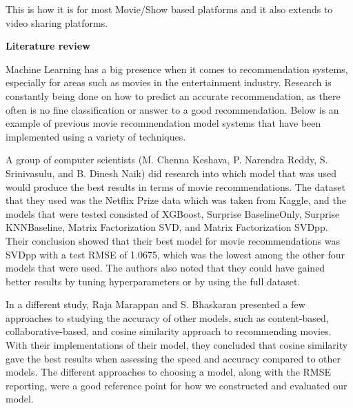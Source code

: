 \documentclass{article}
\begin{document}
\vspace{0.3cm}

This is how it is for most Movie/Show based platforms and it also extends to video sharing platforms.

\vspace{0.3cm}

    \begin{flushleft}
        \textbf{\LARGE Literature review}
    \end{flushleft}

\vspace{0.3cm}

Machine Learning has a big presence when it comes to recommendation systems, especially for areas such as movies in the entertainment industry. Research is constantly being done on how to predict an accurate recommendation, as there often is no fine classification or answer to a good recommendation. Below is an example of previous movie recommendation model systems that have been implemented using a variety of techniques.
\vspace{0.3cm}

A group of computer scientists (M. Chenna Keshava, P. Narendra Reddy, S. Srinivasulu, and B. Dinesh Naik) did research into which model that was used would produce the best results in terms of movie recommendations. The dataset that they used was the Netflix Prize data which was taken from Kaggle, and the models that were tested consisted of XGBoost, Surprise BaselineOnly, Surprise KNNBaseline, Matrix Factorization SVD, and Matrix Factorization SVDpp. Their conclusion showed that their best model for movie recommendations was SVDpp with a test RMSE of 1.0675, which was the lowest among the other four models that were used. The authors also noted that they could have gained better results by tuning hyperparameters or by using the full dataset.

\vspace{0.3cm}

In a different study, Raja Marappan and S. Bhaskaran presented a few approaches to studying the accuracy of other models, such as content-based, collaborative-based, and cosine similarity approach to recommending movies. With their implementations of their model, they concluded that cosine similarity gave the best results when assessing the speed and accuracy compared to other models. 
\vspace{0.3cm}
The different approaches to choosing a model, along with the RMSE reporting, were a good reference point for how we constructed and evaluated our model.
\end{document}
